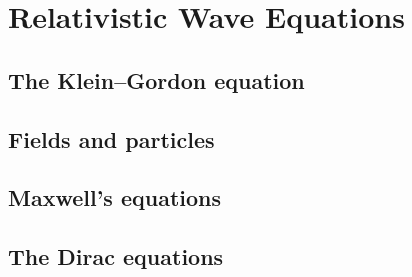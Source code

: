 \section{Relativistic Wave Equations}
\subsection{The Klein--Gordon equation}
\subsection{Fields and particles}
\subsection{Maxwell's equations}
\subsection{The Dirac equations}
